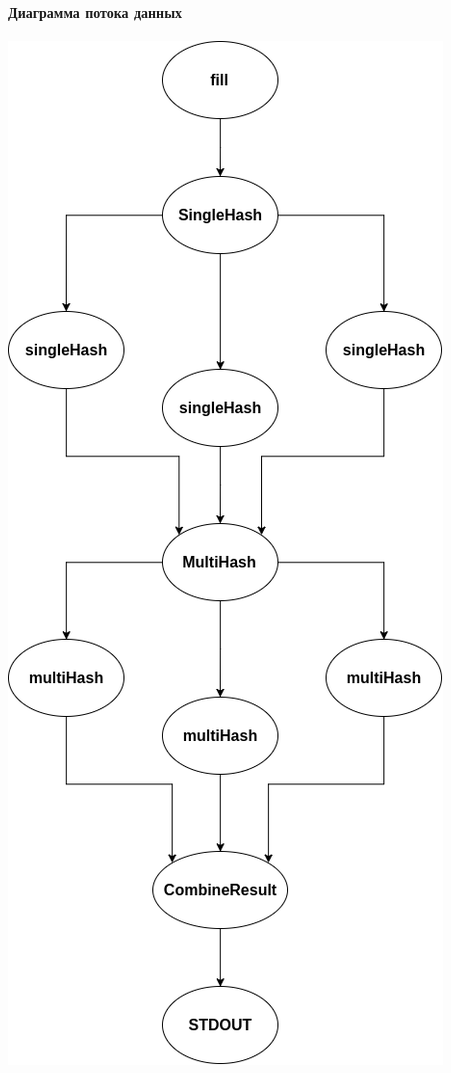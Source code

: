 \documentclass[utf8x, 12pt]{G7-32} %
\begin{document}
\paragraph{Диаграмма потока данных}
\begin{center}
	\includegraphics[scale=0.5]{images/codeFlow.png}
\end{center}
\end{document}
